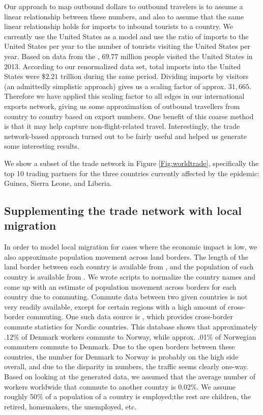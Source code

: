 \documentclass[10pt, journal,onecolumn]{IEEEtran}
\begin{document}
Our approach to map outbound dollars to outbound travelers is to assume a linear relationship
between these numbers, and also to assume that the same linear relationship holds for imports to
inbound tourists to a country.
We currently use the United States as a model and use the ratio of
imports to the United States per year to the number of tourists visiting the United States per year.
Based on data from the \citep{usinboundtourists}, 69.77 million people visited the United States in 2013.
According to our renormalized data set, total imports into the United States were
\$$2.21$ trillion during the same period. Dividing imports by visitors (an admittedly
simplistic approach) gives us a scaling factor of approx. $31,665$. Therefore we have applied this
scaling factor to all edges in our international exports network, giving us some approximation of
outbound travellers from country to country based on export numbers.
One benefit of this coarse method is that it may help capture non-flight-related
travel. Interestingly, the trade network-based approach turned out to be fairly useful and helped us generate
some interesting results.

We show a subset of the trade network in Figure \ref{Fig:worldtrade}, specifically the top 10
trading partners for the three countries currently affected by the epidemic: Guinea, Sierra Leone,
and Liberia.

\subsection{{Supplementing the trade network with local migration}}
\label{SubSec:LocalData}

In order to model local migration for cases where the economic impact is low,
we also approximate population movement across land borders.
The length of the land border between each country is available from
\citep{cialandboundaries}, and the population of each country is available from \citep{ciapopulation}.
We wrote scripts to normalize the country names and come up with an estimate of population movement
across borders for each country due to commuting. Commute data between two given countries is not very
readily available, except for certain regions with a high amount of cross-border commuting.
One such data source is \citep{statnord}, which provides cross-border commute statistics for Nordic countries.
This database shows that approximately .12\% of Denmark workers commute to Norway, while approx. .01\% of
Norwegian commuters commute to Denmark. Due to the open borders between these countries, the number for
Denmark to Norway is probably on the high side overall, and due to the disparity in numbers, the traffic seems
clearly one-way. Based on looking at the generated data, we assumed that the average number of workers worldwide
that commute to another country is 0.02\%.
We assume roughly 50\% of a population of a country is employed;the rest are
children, the retired, homemakers, the unemployed, etc.
\end{document}
